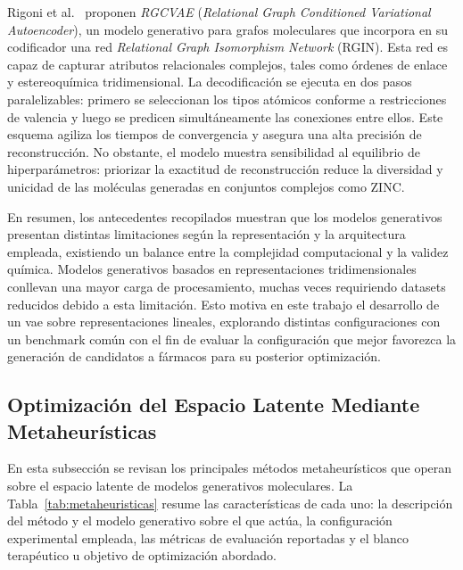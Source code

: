 Rigoni et al.~\cite{rigoni2025rgcvae} proponen \textit{RGCVAE} (\textit{Relational Graph Conditioned Variational Autoencoder}), un modelo generativo para grafos moleculares que incorpora en su codificador una red \textit{Relational Graph Isomorphism Network} (RGIN). Esta red es capaz de capturar atributos relacionales complejos, tales como órdenes de enlace y estereoquímica tridimensional. La decodificación se ejecuta en dos pasos paralelizables: primero se seleccionan los tipos atómicos conforme a restricciones de valencia y luego se predicen simultáneamente las conexiones entre ellos. Este esquema agiliza los tiempos de convergencia y asegura una alta precisión de reconstrucción. No obstante, el modelo muestra sensibilidad al equilibrio de hiperparámetros: priorizar la exactitud de reconstrucción reduce la diversidad y unicidad de las moléculas generadas en conjuntos complejos como ZINC.

\enlargethispage{2\baselineskip}
En resumen, los antecedentes recopilados muestran que los modelos generativos presentan distintas limitaciones según la representación y la arquitectura empleada, existiendo un balance entre la complejidad computacional y la validez química. Modelos generativos basados en representaciones tridimensionales conllevan una mayor carga de procesamiento, muchas veces requiriendo datasets reducidos debido a esta limitación. Esto motiva en este trabajo el desarrollo de un \gls{vae} sobre representaciones lineales, explorando distintas configuraciones con un benchmark común con el fin de evaluar la configuración que mejor favorezca la generación de candidatos a fármacos para su posterior optimización.

\subsection{Optimización del Espacio Latente Mediante Metaheurísticas}
\label{subsec:art_metaheuristicas}

En esta subsección se revisan los principales métodos metaheurísticos que operan sobre el espacio latente de modelos generativos moleculares. La Tabla~\ref{tab:metaheuristicas} resume las características de cada uno: la descripción del método y el modelo generativo sobre el que actúa, la configuración experimental empleada, las métricas de evaluación reportadas y el blanco terapéutico u objetivo de optimización abordado.

